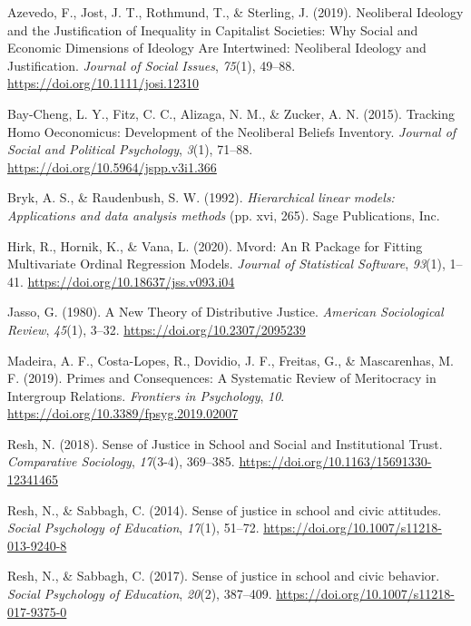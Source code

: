 \documentclass[
  12pt,
]{article}
\begin{document}
\leavevmode\hypertarget{ref-azevedo_Neoliberal_2019}{}%
Azevedo, F., Jost, J. T., Rothmund, T., \& Sterling, J. (2019).
Neoliberal Ideology and the Justification of Inequality in Capitalist
Societies: Why Social and Economic Dimensions of Ideology Are
Intertwined: Neoliberal Ideology and Justification. \emph{Journal of
Social Issues}, \emph{75}(1), 49--88.
\url{https://doi.org/10.1111/josi.12310}

\leavevmode\hypertarget{ref-bay-cheng_Tracking_2015a}{}%
Bay-Cheng, L. Y., Fitz, C. C., Alizaga, N. M., \& Zucker, A. N. (2015).
Tracking Homo Oeconomicus: Development of the Neoliberal Beliefs
Inventory. \emph{Journal of Social and Political Psychology},
\emph{3}(1), 71--88. \url{https://doi.org/10.5964/jspp.v3i1.366}

\leavevmode\hypertarget{ref-bryk_Hierarchical_1992}{}%
Bryk, A. S., \& Raudenbush, S. W. (1992). \emph{Hierarchical linear
models: Applications and data analysis methods} (pp. xvi, 265). Sage
Publications, Inc.

\leavevmode\hypertarget{ref-hirk_mvord_2020}{}%
Hirk, R., Hornik, K., \& Vana, L. (2020). Mvord: An R Package for
Fitting Multivariate Ordinal Regression Models. \emph{Journal of
Statistical Software}, \emph{93}(1), 1--41.
\url{https://doi.org/10.18637/jss.v093.i04}

\leavevmode\hypertarget{ref-jasso_New_1980}{}%
Jasso, G. (1980). A New Theory of Distributive Justice. \emph{American
Sociological Review}, \emph{45}(1), 3--32.
\url{https://doi.org/10.2307/2095239}

\leavevmode\hypertarget{ref-madeira_Primes_2019}{}%
Madeira, A. F., Costa-Lopes, R., Dovidio, J. F., Freitas, G., \&
Mascarenhas, M. F. (2019). Primes and Consequences: A Systematic Review
of Meritocracy in Intergroup Relations. \emph{Frontiers in Psychology},
\emph{10}. \url{https://doi.org/10.3389/fpsyg.2019.02007}

\leavevmode\hypertarget{ref-resh_Sense_2018}{}%
Resh, N. (2018). Sense of Justice in School and Social and Institutional
Trust. \emph{Comparative Sociology}, \emph{17}(3-4), 369--385.
\url{https://doi.org/10.1163/15691330-12341465}

\leavevmode\hypertarget{ref-resh_Sense_2014}{}%
Resh, N., \& Sabbagh, C. (2014). Sense of justice in school and civic
attitudes. \emph{Social Psychology of Education}, \emph{17}(1), 51--72.
\url{https://doi.org/10.1007/s11218-013-9240-8}

\leavevmode\hypertarget{ref-resh_Sense_2017}{}%
Resh, N., \& Sabbagh, C. (2017). Sense of justice in school and civic
behavior. \emph{Social Psychology of Education}, \emph{20}(2), 387--409.
\url{https://doi.org/10.1007/s11218-017-9375-0}
\end{document}
